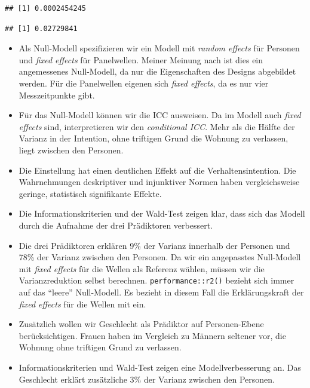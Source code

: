 \documentclass[
]{book}
\newenvironment{Shaded}{\begin{snugshade}}{\end{snugshade}}
\newcommand{\CommentTok}[1]{\textcolor[rgb]{0.56,0.35,0.01}{\textit{#1}}}
\newcommand{\DecValTok}[1]{\textcolor[rgb]{0.00,0.00,0.81}{#1}}
\newcommand{\KeywordTok}[1]{\textcolor[rgb]{0.13,0.29,0.53}{\textbf{#1}}}
\newcommand{\NormalTok}[1]{#1}
\newcommand{\OperatorTok}[1]{\textcolor[rgb]{0.81,0.36,0.00}{\textbf{#1}}}
\newcommand{\StringTok}[1]{\textcolor[rgb]{0.31,0.60,0.02}{#1}}
\begin{document}
\begin{verbatim}
## [1] 0.0002454245
\end{verbatim}

\begin{Shaded}
\end{Shaded}

\begin{verbatim}
## [1] 0.02729841
\end{verbatim}

\begin{itemize}
\item
  Als Null-Modell spezifizieren wir ein Modell mit \emph{random effects} für Personen und \emph{fixed effects} für Panelwellen. Meiner Meinung nach ist dies ein angemessenes Null-Modell, da nur die Eigenschaften des Designs abgebildet werden. Für die Panelwellen eigenen sich \emph{fixed effects}, da es nur vier Messzeitpunkte gibt.
\item
  Für das Null-Modell können wir die ICC ausweisen. Da im Modell auch \emph{fixed effects} sind, interpretieren wir den \emph{conditional ICC}. Mehr als die Hälfte der Varianz in der Intention, ohne triftigen Grund die Wohnung zu verlassen, liegt zwischen den Personen.
\item
  Die Einstellung hat einen deutlichen Effekt auf die Verhaltensintention. Die Wahrnehmungen deskriptiver und injunktiver Normen haben vergleichsweise geringe, statistisch signifikante Effekte.
\item
  Die Informationskriterien und der Wald-Test zeigen klar, dass sich das Modell durch die Aufnahme der drei Prädiktoren verbessert.
\item
  Die drei Prädiktoren erklären 9\% der Varianz innerhalb der Personen und 78\% der Varianz zwischen den Personen. Da wir ein angepasstes Null-Modell mit \emph{fixed effects} für die Wellen als Referenz wählen, müssen wir die Varianzreduktion selbst berechnen. \texttt{performance::r2()} bezieht sich immer auf das ``leere'' Null-Modell. Es bezieht in diesem Fall die Erklärungskraft der \emph{fixed effects} für die Wellen mit ein.
\item
  Zusätzlich wollen wir Geschlecht als Prädiktor auf Personen-Ebene berücksichtigen. Frauen haben im Vergleich zu Männern seltener vor, die Wohnung ohne triftigen Grund zu verlassen.
\item
  Informationskriterien und Wald-Test zeigen eine Modellverbesserung an. Das Geschlecht erklärt zusätzliche 3\% der Varianz zwischen den Personen.
\end{itemize}
\end{document}
